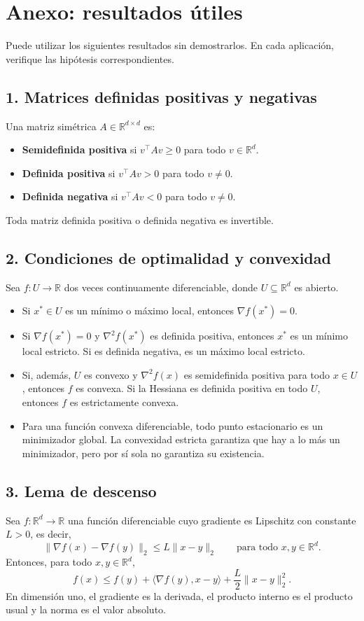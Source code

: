 \documentclass[a4paper,12 pt]{article}
\theoremstyle{definition}
\newcommand{\R}{\mathbb{R}}
\begin{document}
	
\section*{Anexo: resultados útiles}
Puede utilizar los siguientes resultados sin demostrarlos. En cada aplicación, verifique las hipótesis correspondientes.

\subsection*{1. Matrices definidas positivas y negativas}
Una matriz simétrica $A\in\R^{d\times d}$ es:
\begin{itemize}
    \item \textbf{Semidefinida positiva} si $v^\top Av\geq0$ para todo $v\in\R^d$.
    \item \textbf{Definida positiva} si $v^\top Av>0$ para todo $v\neq0$.
    \item \textbf{Definida negativa} si $v^\top Av<0$ para todo $v\neq0$.
\end{itemize}
Toda matriz definida positiva o definida negativa es invertible.

\subsection*{2. Condiciones de optimalidad y convexidad}
Sea $f:U\to\R$ dos veces continuamente diferenciable, donde $U\subseteq\R^d$ es abierto.
\begin{itemize}
    \item Si $x^*\in U$ es un mínimo o máximo local, entonces $\nabla f(x^*)=0$.
    \item Si $\nabla f(x^*)=0$ y $\nabla^2f(x^*)$ es definida positiva, entonces $x^*$ es un mínimo local estricto. Si es definida negativa, es un máximo local estricto.
    \item Si, además, $U$ es convexo y $\nabla^2f(x)$ es semidefinida positiva para todo $x\in U$, entonces $f$ es convexa. Si la Hessiana es definida positiva en todo $U$, entonces $f$ es estrictamente convexa.
    \item Para una función convexa diferenciable, todo punto estacionario es un minimizador global. La convexidad estricta garantiza que hay a lo más un minimizador, pero por sí sola no garantiza su existencia.
\end{itemize}

\subsection*{3. Lema de descenso}
Sea $f:\R^d\to\R$ una función diferenciable cuyo gradiente es Lipschitz con constante $L>0$, es decir,
\[
\|\nabla f(x)-\nabla f(y)\|_2\leq L\|x-y\|_2
\qquad\text{para todo }x,y\in\R^d.
\]
Entonces, para todo $x,y\in\R^d$,
\[
\boxed{f(x)\leq f(y)+\langle\nabla f(y),x-y\rangle
+\frac{L}{2}\|x-y\|_2^2.}
\]
En dimensión uno, el gradiente es la derivada, el producto interno es el producto usual y la norma es el valor absoluto.
\end{document}
